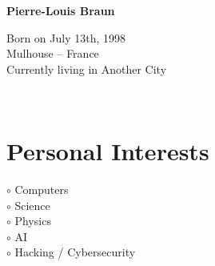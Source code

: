 \documentclass[a4paper,10pt]{article}
\begin{document}
\thispagestyle{empty}

\begin{adjustbox}{valign=t}
\begin{minipage}{0.3\textwidth} %
\begin{center}

\MySkip 	%

\raggedright
{\LARGE \bfseries Pierre-Louis Braun}

\MySkip 	%

Born on July 13th, 1998\\
Mulhouse -- France\\
Currently living in Another City\\

\MySkip 	%

\textcolor{ColorTwo}{\faEnvelopeO}
 \\

\end{center}

\vfill

\section*{Personal Interests}
\raggedright
\begin{spacing}{1.0}
\textcolor{ColorOne}{$\circ$} Computers\\
\textcolor{ColorOne}{$\circ$} Science\\
\textcolor{ColorOne}{$\circ$} Physics\\
\textcolor{ColorOne}{$\circ$} AI\\
\textcolor{ColorOne}{$\circ$} Hacking / Cybersecurity\\
\end{spacing}


\end{minipage}
\end{adjustbox}
\end{document}
